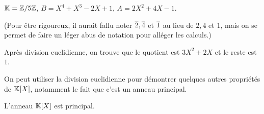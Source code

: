 \documentclass[12pt, a4paper]{report}
\begin{document}
\begin{example}
    $\mathbb{K} = \mathbb{Z}/5\mathbb{Z}$, $B = X^4 + X^3 - 2X + 1$, $A = 2X^2 + 4X - 1$.

    (Pour être rigoureux, il aurait fallu noter $\overline{2},\overline{4}$ et $\overline{1}$ au lieu de $2,4$ et $1$, mais on se permet de faire un léger abus de notation pour alléger les calculs.)


    Après division euclidienne, on trouve que le quotient est $3X^2 + 2X$ et le reste est $1$.

\end{example}

On peut utiliser la division euclidienne pour démontrer quelques autres propriétés de $\mathbb{K}[X]$, notamment le fait que c'est un anneau principal.

\begin{property}
    L'anneau $\mathbb{K}[X]$ est principal.
\end{property}
\end{document}
